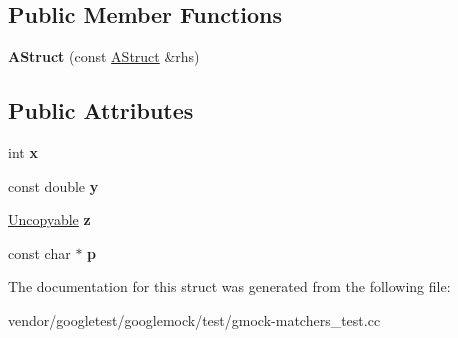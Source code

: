 \subsection*{Public Member Functions}
\begin{DoxyCompactItemize}
\item 
\mbox{\label{structtesting_1_1gmock__matchers__test_1_1_a_struct_ac5b9c0054e929e8883e13123aef50ff3}} 
{\bfseries A\+Struct} (const \mbox{\hyperlink{structtesting_1_1gmock__matchers__test_1_1_a_struct}{A\+Struct}} \&rhs)
\end{DoxyCompactItemize}
\subsection*{Public Attributes}
\begin{DoxyCompactItemize}
\item 
\mbox{\label{structtesting_1_1gmock__matchers__test_1_1_a_struct_a539eea02599ad34ff2bf90cc2c1adf26}} 
int {\bfseries x}
\item 
\mbox{\label{structtesting_1_1gmock__matchers__test_1_1_a_struct_a08b8592764aa4775c3d5a3542470f8bb}} 
const double {\bfseries y}
\item 
\mbox{\label{structtesting_1_1gmock__matchers__test_1_1_a_struct_a45b1006e4a7b21037610a385dcae6d8c}} 
\mbox{\hyperlink{classtesting_1_1gmock__matchers__test_1_1_uncopyable}{Uncopyable}} {\bfseries z}
\item 
\mbox{\label{structtesting_1_1gmock__matchers__test_1_1_a_struct_a65755db7d763d53c13483bb520f1efcd}} 
const char $\ast$ {\bfseries p}
\end{DoxyCompactItemize}


The documentation for this struct was generated from the following file\+:\begin{DoxyCompactItemize}
\item 
vendor/googletest/googlemock/test/gmock-\/matchers\+\_\+test.\+cc\end{DoxyCompactItemize}
